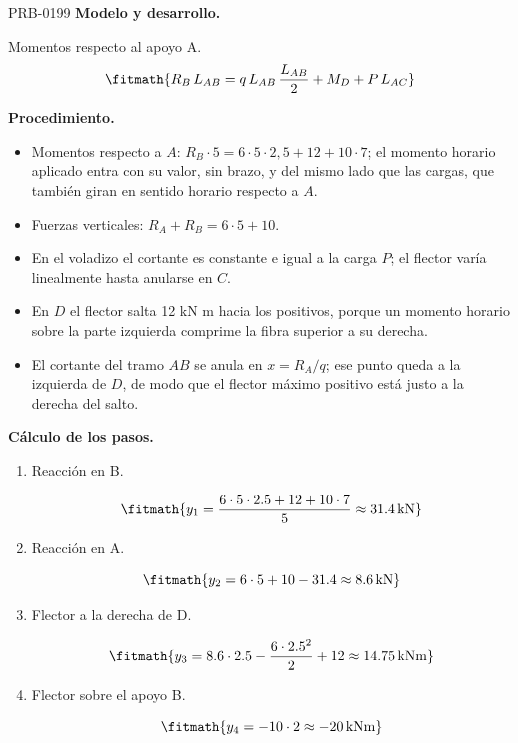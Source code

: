 \begin{studiumworked}{PRB-0199}
\textbf{Modelo y desarrollo.}

Momentos respecto al apoyo A.\[\fitmath{R_B\,L_{AB} = q\,L_{AB}\,\frac{L_{AB}}{2} + M_D + P\,L_{AC}}\]

\textbf{Procedimiento.}\begin{itemize}\item Momentos respecto a $A$: $R_B \cdot 5 = 6 \cdot 5 \cdot 2{,}5 + 12 + 10 \cdot 7$; el momento horario aplicado entra con su valor, sin brazo, y del mismo lado que las cargas, que también giran en sentido horario respecto a $A$.
\item Fuerzas verticales: $R_A + R_B = 6 \cdot 5 + 10$.
\item En el voladizo el cortante es constante e igual a la carga $P$; el flector varía linealmente hasta anularse en $C$.
\item En $D$ el flector salta 12 kN m hacia los positivos, porque un momento horario sobre la parte izquierda comprime la fibra superior a su derecha.
\item El cortante del tramo $AB$ se anula en $x = R_A/q$; ese punto queda a la izquierda de $D$, de modo que el flector máximo positivo está justo a la derecha del salto.\end{itemize}

\textbf{Cálculo de los pasos.}

\begin{enumerate}

\item Reacción en B.

\[\fitmath{y_{1}=\frac{6\cdot 5\cdot 2.5+12+10\cdot 7}{5}\approx 31.4\,\mathrm{kN}}\]

\item Reacción en A.

\[\fitmath{y_{2}=6\cdot 5+10-31.4\approx 8.6\,\mathrm{kN}}\]

\item Flector a la derecha de D.

\[\fitmath{y_{3}=8.6\cdot 2.5-\frac{6\cdot {2.5}^{2}}{2}+12\approx 14.75\,\mathrm{kN m}}\]

\item Flector sobre el apoyo B.

\[\fitmath{y_{4}=-10\cdot 2\approx -20\,\mathrm{kN m}}\]

\end{enumerate}


\end{studiumworked}
